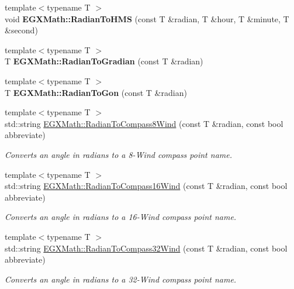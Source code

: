 \begin{DoxyCompactItemize}
{\footnotesize template$<$typename T $>$ }\\void {\bfseries E\+G\+X\+Math\+::\+Radian\+To\+H\+MS} (const T \&radian, T \&hour, T \&minute, T \&second)
\item 
\mbox{\label{group___angle_conversions_ga3c1607eae50cbf0186c42485bb3878d5}} 
{\footnotesize template$<$typename T $>$ }\\T {\bfseries E\+G\+X\+Math\+::\+Radian\+To\+Gradian} (const T \&radian)
\item 
\mbox{\label{group___angle_conversions_ga36912e5a810b64c271c4dafc17f4ca45}} 
{\footnotesize template$<$typename T $>$ }\\T {\bfseries E\+G\+X\+Math\+::\+Radian\+To\+Gon} (const T \&radian)
\item 
{\footnotesize template$<$typename T $>$ }\\std\+::string \mbox{\hyperlink{group___angle_conversions_ga3c06a01860f69bcd57fab918037318b3}{E\+G\+X\+Math\+::\+Radian\+To\+Compass8\+Wind}} (const T \&radian, const bool abbreviate)
\begin{DoxyCompactList}\small\item\em Converts an angle in radians to a 8-\/\+Wind compass point name. \end{DoxyCompactList}\item 
{\footnotesize template$<$typename T $>$ }\\std\+::string \mbox{\hyperlink{group___angle_conversions_gae3be24eac965abfab281c6307fed482a}{E\+G\+X\+Math\+::\+Radian\+To\+Compass16\+Wind}} (const T \&radian, const bool abbreviate)
\begin{DoxyCompactList}\small\item\em Converts an angle in radians to a 16-\/\+Wind compass point name. \end{DoxyCompactList}\item 
{\footnotesize template$<$typename T $>$ }\\std\+::string \mbox{\hyperlink{group___angle_conversions_ga64587b5f303e1921ab34bc344b5089bb}{E\+G\+X\+Math\+::\+Radian\+To\+Compass32\+Wind}} (const T \&radian, const bool abbreviate)
\begin{DoxyCompactList}\small\item\em Converts an angle in radians to a 32-\/\+Wind compass point name. \end{DoxyCompactList}\end{DoxyCompactItemize}


